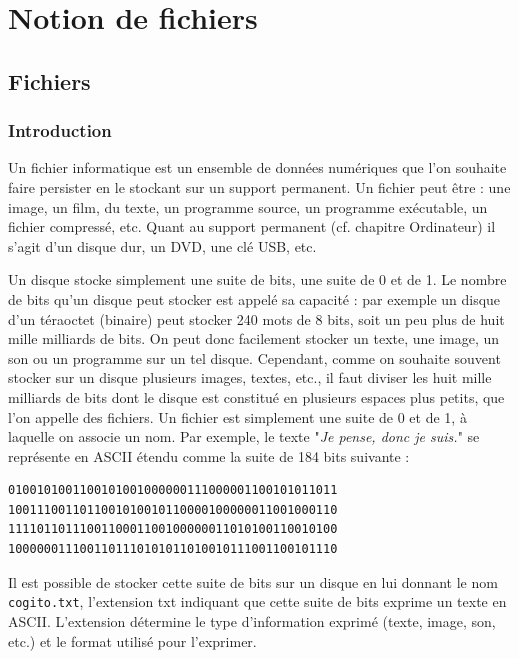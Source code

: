 \documentclass[11pt, a4paper]{book}
\begin{document}
\setcounter{chapter}{2}

\chapter{Notion de fichiers}

\section{Fichiers}
\subsection{Introduction}

Un fichier informatique est un ensemble de données numériques que l'on souhaite faire persister en le stockant sur un support permanent. Un fichier peut être : une image, un film, du texte, un programme source, un programme exécutable, un fichier compressé, etc. Quant au support permanent (cf. chapitre Ordinateur) il s'agit d'un disque dur, un DVD, une clé USB, etc.

Un disque stocke simplement une suite de bits, une suite de 0 et de 1. Le nombre de bits qu’un disque peut stocker est appelé sa capacité : par exemple un disque d’un téraoctet (binaire) peut stocker 240 mots de 8 bits, soit un peu plus de huit mille milliards de bits. On peut donc facilement stocker un texte, une image, un son ou un programme sur un tel disque. Cependant, comme on souhaite souvent stocker sur un disque plusieurs images, textes, etc., il faut diviser les huit mille milliards de bits dont le disque est constitué en plusieurs espaces plus petits, que l’on appelle des fichiers. Un fichier est simplement une suite de 0 et de 1, à laquelle on associe un nom. Par exemple, le texte "\textit{Je pense, donc je suis.}" se représente en ASCII étendu comme la suite de 184 bits suivante :

\begin{verbatim}
0100101001100101001000000111000001100101011011
1001110011011001010010110000100000011001000110
1111011011100110001100100000011010100110010100
1000000111001101110101011010010111001100101110
\end{verbatim}

Il est possible de stocker cette suite de bits sur un disque en lui donnant le nom \texttt{cogito.txt}, l’extension txt indiquant que cette suite de bits exprime un texte en ASCII. L’extension détermine le type d’information exprimé (texte, image, son, etc.) et le format utilisé pour l’exprimer.
\end{document}
